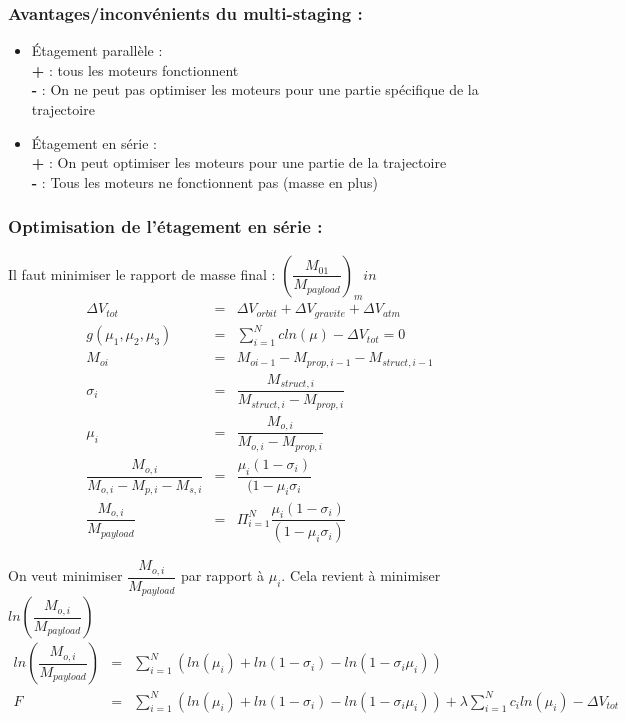 \documentclass{report}
\begin{document}
\subsubsection{Avantages/inconvénients du multi-staging :}

\begin{itemize}
    \item Étagement parallèle :\\
    \textbf{+} : tous les moteurs fonctionnent\\
    \textbf{-} : On ne peut pas optimiser les moteurs pour une partie spécifique de la trajectoire
    \item Étagement en série :\\
    \textbf{+} : On peut optimiser les moteurs pour une partie de la trajectoire\\
    \textbf{-} : Tous les moteurs ne fonctionnent pas (masse en plus)
\end{itemize}

\subsubsection{Optimisation de l'étagement en série :}

Il faut minimiser le rapport de masse final : $\left(\dfrac{M_{01}}{M_{payload}}\right)_min$\\


\begin{eqnarray}
\Delta V_{tot} &= &\Delta V_{orbit}+\Delta V_{gravite} +\Delta V_{atm}\\
g(\mu_1,\mu_2,\mu_3) &= &\sum_{i=1}^N c ln(\mu)-\Delta V_{tot} = 0\\
 M_{oi} &= &M_{oi-1}-M_{prop,i-1}-M_{struct,i-1} \\
\sigma_i &= &\dfrac{M_{struct,i}}{M_{struct,i}-M_{prop,i}}\\
\mu_i &= &\dfrac{M_{o,i}}{M_{o,i}-M_{prop,i}}\\
\dfrac{M_{o,i}}{M_{o,i}-M_{p,i}-M_{s,i}} &= &\dfrac{\mu_i(1-\sigma_i)}{(1-\mu_i\sigma_i}\\
\dfrac{M_{o,i}}{M_{payload}} &= &\Pi_{i=1}^N\dfrac{\mu_i(1-\sigma_i)}{(1-\mu_i\sigma_i)}
\end{eqnarray}

On veut minimiser $\dfrac{M_{o,i}}{M_{payload}}$ par rapport à $\mu_i$. Cela revient à minimiser $ln\left(\dfrac{M_{o,i}}{M_{payload}}\right)$
\begin{eqnarray}
ln\left(\dfrac{M_{o,i}}{M_{payload}}\right) &= &\sum_{i=1}^N \left(ln(\mu_i)+ln(1-\sigma_i)-ln(1-\sigma_i\mu_i)\right)\\
F &= &\sum_{i=1}^N \left(ln(\mu_i)+ln(1-\sigma_i)-ln(1-\sigma_i\mu_i)\right) + \lambda\sum_{i=1}^N c_iln(\mu_i)-\Delta V_{tot}
\end{eqnarray}
\end{document}
